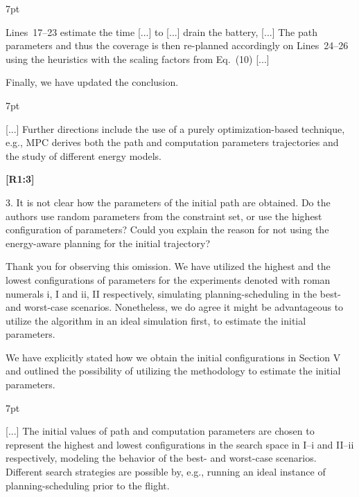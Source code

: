 \documentclass[10pt]{letter}
\newenvironment{formal}{%
  \def\FrameCommand{%
    \hspace{1pt}%
    {\color{red}\vrule width 2pt}%
    {\color{formalshade}\vrule width 4pt}%
    \colorbox{formalshade}%
  }%
  \MakeFramed{\advance\hsize-\width\FrameRestore}%
  \noindent\hspace{-4.55pt}%
  \begin{adjustwidth}{}{7pt}%
  \vspace{2pt}\vspace{2pt}%
}
{%
  \vspace{2pt}\end{adjustwidth}\endMakeFramed%
}
\begin{document}
{\begin{formal}
  Lines~{\color{red}17}--{\color{red}23} estimate the time [...] to [...] drain the battery, [...] The {\color{blue}path parameters and thus the} coverage is then re{\color{blue}-}planned accordingly on Lines~{\color{red}24}--{\color{red}26} using {\color{blue} the heuristics with the} %
  scaling factors from Eq.~({\color{red}10}) [...]

  \vspace*{1ex}
  \end{formal}

  Finally, we have updated the conclusion.

  \begin{formal}
  \color{black}
  [...] Further directions include {\color{blue}the use of a purely optimization-based technique, e.g., MPC derives both the path and computation parameters trajectories and} the study of different energy models.
  \vspace*{1ex}
  \end{formal}
}

{\hspace*{-4.5em}\textbf{[R1:3]}\vspace*{-1.9em}}

3. It is not clear how the parameters of the initial path are obtained. Do the authors use random parameters from the constraint set, or use the highest configuration of parameters? Could you explain the reason for not using the energy-aware planning for the initial trajectory?

{\color{blue}

{\hspace*{-4.5em}{[R1:3]}\vspace*{-1.9em}}

Thank you for observing this omission. We have utilized the highest and the lowest configurations of parameters for the experiments denoted with roman numerals i, I and ii, II respectively, simulating planning-scheduling in the best- and worst-case scenarios. Nonetheless, we do agree it might be advantageous to utilize the algorithm in an ideal simulation first, to estimate the initial parameters.

We have explicitly stated how we obtain the initial configurations in Section V and outlined the possibility of utilizing the methodology to estimate the initial parameters.

\begin{formal}
  \color{black} [...] {\color{blue} The initial values of path and computation parameters are chosen to represent the highest and lowest configurations in the search space in {\color{red}I}--{\color{red}i} and {\color{red}II}--{\color{red}ii} respectively, modeling the behavior of the best- and worst-case scenarios. Different search strategies are possible by, e.g., running an ideal instance of planning-scheduling prior to the flight.}
  \vspace*{1ex}
\end{formal}

}
\end{document}
